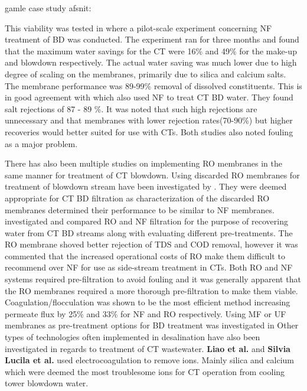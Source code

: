 


gamle case study afsnit: 

This viability was tested in \citep{altmanMembraneTreatmentSidestream2012} where a pilot-scale experiment concerning NF treatment of BD was conducted.
The experiment ran for three months and found that the maximum water savings for the CT were 16\% and 49\% for the make-up and blowdown respectively.
The actual water saving was much lower due to high degree of scaling on the membranes, primarily due to silica and calcium salts.
The membrane performance was 89-99\% removal of dissolved constituents.
This is in good agreement with \citep{kaliappan_RecoveryReuseWater_2005} which also used NF to treat CT BD water.
They found salt rejections of 87 - 89 \%.
It was noted that such high rejections are unnecessary and that membranes with lower rejection rates(70-90\%) but higher recoveries would better suited for use with CTs.
Both studies also noted fouling as a major problem.


There has also been multiple studies on implementing RO membranes in the same manner for treatment of CT blowdown.
Using discarded RO membranes for treatment of blowdown stream have been investigated by \citep{frickEvaluationPretreatmentsBlowdown2014}.
They were deemed appropriate for CT BD filtration as characterization of the discarded RO membranes determined their performance to be similar to NF membranes.
\citep{farahanniRecoveryCoolingTower_2016}investigated and compared RO and NF filtration for the purpose of recovering water from CT BD streams along with evaluating different pre-treatments.
The RO membrane shoved better rejection of TDS and COD removal, however it was commented that the increased operational costs of RO make them difficult to recommend over NF for use as side-stream treatment in CTs.
Both RO and NF systems required pre-filtration to avoid fouling and it was generally apparent that the RO membranes required a more thorough pre-filtration to make them viable.
Coagulation/flocculation was shown to be the most efficient method increasing permeate flux by 25\% and 33\% for NF and RO respectively.
Using MF or UF membranes as pre-treatment options for BD treatment was investigated in \citep{zhangPilotTestingOutsidein2007,zhangPilotTestUF2008}  
Other types of technologies often implemented in desalination have also been investigated in regards to treatment of CT wastewater.
\textbf{Liao et al.} and \textbf{Silvia Lucila et al.} used electrocoagulation to remove ions. 
Mainly silica and calcium which were deemed the most troublesome ions for CT operation from cooling tower blowdown water.

